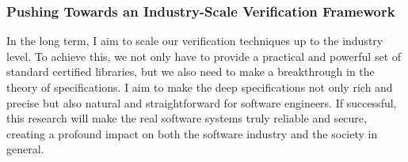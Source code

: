 \documentclass[a4paper, 10pt]{article}
\begin{document}
\begin{small}
\subsubsection*{\small Pushing Towards  an Industry-Scale Verification Framework}
In the long term, I aim to 
scale our verification techniques up to the industry level. To achieve this, we not only have to provide a practical and powerful
set of standard certified libraries, but we also need to make a breakthrough in the theory of specifications. I aim to make the deep specifications  not only rich and precise 
but also natural and straightforward for software engineers.
If successful,
this research will make
the real software systems truly reliable and secure, creating  a profound impact on both the software industry
 and the society in general.
 
\vspace{0.5cm}

\end{small}
\end{document}
